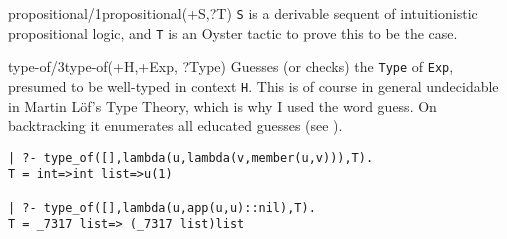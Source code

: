 \begin{predicate}{propositional/1}{propositional(+S,?T)}%
{\tt S} is a derivable sequent of intuitionistic propositional logic,
and {\tt T} is an Oyster tactic to prove this to be the case.
\end{predicate}

\begin{predicate}{type-of/3}{type-of(+H,+Exp, ?Type)}%
Guesses (or checks) the {\tt Type} of {\tt Exp}, presumed to be
well-typed in context {\tt H}. This is of course in
general undecidable in Martin L\"{o}f's Type Theory, which is why I
used the word guess.  On backtracking it enumerates all educated
guesses (see ).

{\small\begin{verbatim}
| ?- type_of([],lambda(u,lambda(v,member(u,v))),T).
T = int=>int list=>u(1)

| ?- type_of([],lambda(u,app(u,u)::nil),T).
T = _7317 list=> (_7317 list)list 
\end{verbatim}
}
\end{predicate}

